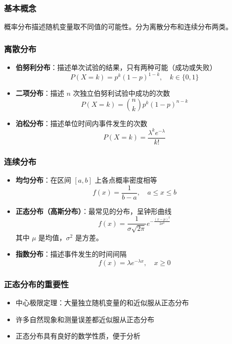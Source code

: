 \documentclass[12pt,UTF8]{ctexbook}
\begin{document}
\subsubsection{基本概念}

概率分布描述随机变量取不同值的可能性。分为离散分布和连续分布两类。

\subsubsection{离散分布}

\begin{itemize}[leftmargin=2cm]
    \item \textbf{伯努利分布}：描述单次试验的结果，只有两种可能（成功或失败）
    $$P(X=k) = p^k (1-p)^{1-k}, \quad k \in \{0, 1\}$$
    
    \item \textbf{二项分布}：描述 $n$ 次独立伯努利试验中成功的次数
    $$P(X=k) = \binom{n}{k} p^k (1-p)^{n-k}$$
    
    \item \textbf{泊松分布}：描述单位时间内事件发生的次数
    $$P(X=k) = \frac{\lambda^k e^{-\lambda}}{k!}$$
\end{itemize}

\subsubsection{连续分布}

\begin{itemize}[leftmargin=2cm]
    \item \textbf{均匀分布}：在区间 $[a, b]$ 上各点概率密度相等
    $$f(x) = \frac{1}{b-a}, \quad a \leq x \leq b$$
    
    \item \textbf{正态分布（高斯分布）}：最常见的分布，呈钟形曲线
    $$f(x) = \frac{1}{\sigma\sqrt{2\pi}} e^{-\frac{(x-\mu)^2}{2\sigma^2}}$$
    其中 $\mu$ 是均值，$\sigma^2$ 是方差。
    
    \item \textbf{指数分布}：描述事件发生的时间间隔
    $$f(x) = \lambda e^{-\lambda x}, \quad x \geq 0$$
\end{itemize}

\subsubsection{正态分布的重要性}

\begin{itemize}[leftmargin=2cm]
    \item 中心极限定理：大量独立随机变量的和近似服从正态分布
    \item 许多自然现象和测量误差都近似服从正态分布
    \item 正态分布具有良好的数学性质，便于分析
\end{itemize}
\end{document}
